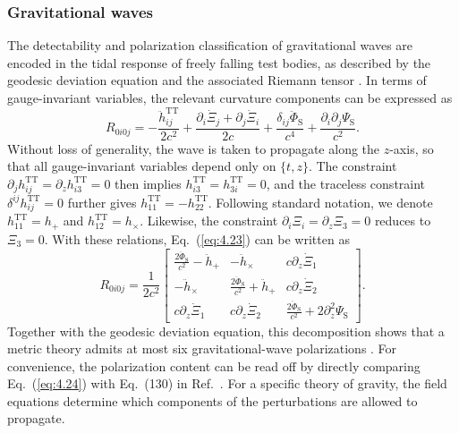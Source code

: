 \documentclass[aps,prd,twocolumn]{revtex4-2}
\newcommand\p{\partial}
\begin{document}
\subsubsection{Gravitational waves}
The detectability and polarization classification of gravitational waves are encoded in the tidal response of freely falling test bodies, as described by the geodesic deviation equation and the associated Riemann tensor \cite{Pirani1956.ActaPhysPol.15.389,Eardley1973.PRD.8.3308}. In terms of gauge-invariant variables, the relevant curvature components can be expressed as \cite{Flanagan2005.NewJPhys.7.204}
\begin{equation}\label{eq:4.23}
  R_{0i0j} = - \frac{\ddot{h}_{ij}^\mathrm{TT}}{2c^2} + \frac{\p_i \dot{\Xi}_j + \p_j \dot{\Xi}_i}{2c} + \frac{\delta_{ij}\ddot{\Phi}_\mathrm{S}}{c^4} + \frac{\p_i\p_j\Psi_\mathrm{S}}{c^2}.
\end{equation}
Without loss of generality, the wave is taken to propagate along the $z$-axis, so that all gauge-invariant variables depend only on $\{t,z\}$. The constraint $\p_j h_{ij}^\mathrm{TT} = \p_z h_{i3}^\mathrm{TT} = 0$ then implies $h_{i3}^\mathrm{TT}=h_{3i}^\mathrm{TT}=0$, and the traceless constraint $\delta^{ij}h_{ij}^\mathrm{TT}=0$ further gives $h_{11}^\mathrm{TT}=-h_{22}^\mathrm{TT}$. Following standard notation, we denote $h_{11}^\mathrm{TT}=h_{+}$ and $h_{12}^\mathrm{TT}=h_\times$. Likewise, the constraint $\p_i\Xi_i=\p_z\Xi_3=0$ reduces to $\Xi_3=0$. With these relations, Eq.~(\ref{eq:4.23}) can be written as
\begin{equation}\label{eq:4.24}
  R_{0i0j} = 
  \frac{1}{2c^2}
  \begin{bmatrix}
    \displaystyle\frac{2\ddot{\Phi}_\mathrm{S}}{c^2} -\ddot{h}_{+}  &  -\ddot{h}_{\times}                          &  c\p_z \dot{\Xi}_1  \\
    -\ddot{h}_{\times}                         &  \displaystyle\frac{2\ddot{\Phi}_\mathrm{S}}{c^2} + \ddot{h}_{+}  &  c\p_z \dot{\Xi}_2  \\
    c\p_z \dot{\Xi}_1                          &  c\p_z \dot{\Xi}_2                           &  \displaystyle\frac{2\ddot{\Phi}_\mathrm{S}}{c^2} + 2\p_z^2\Psi_\mathrm{S}
  \end{bmatrix}.
\end{equation}
Together with the geodesic deviation equation, this decomposition shows that a metric theory admits at most six gravitational-wave polarizations \cite{Eardley1973.PRD.8.3308,Eardley1973.PRL.30.884}. For convenience, the polarization content can be read off by directly comparing Eq.~(\ref{eq:4.24}) with Eq.~(130) in Ref.~\cite{Will2014.LRR.17.4}. For a specific theory of gravity, the field equations determine which components of the perturbations are allowed to propagate.
\end{document}
